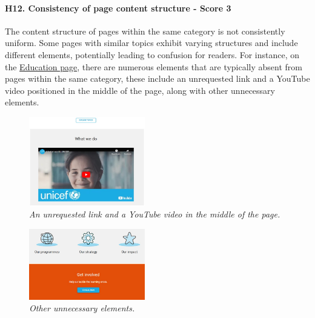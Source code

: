 \paragraph{H12. Consistency of page content structure - Score 3}	The content structure of pages within the same category is not consistently uniform. Some pages with similar topics exhibit varying structures and include different elements, potentially leading to confusion for readers. For instance, on the  \href{https://www.unicef.org/education}{Education page}, there are numerous elements that are typically absent from pages within the same category, these include an unrequested link and a YouTube video positioned in the middle of the page, along with other unnecessary elements.
\begin{figure}[!h]
	\begin{center}
		\includegraphics[width=0.45\textwidth]{Picture7.jpg}
		\captionsetup{font=small}
		\caption{\textit{ An unrequested link and a YouTube video in the middle of the page.}}
	\end{center}
\end{figure}
\begin{figure}[!h]
	\begin{center}
		\includegraphics[width=0.45\textwidth]{Picture8.jpg}
		\captionsetup{font=small}
		\caption{\textit{Other unnecessary elements.}}
	\end{center}
\end{figure}
\newline
